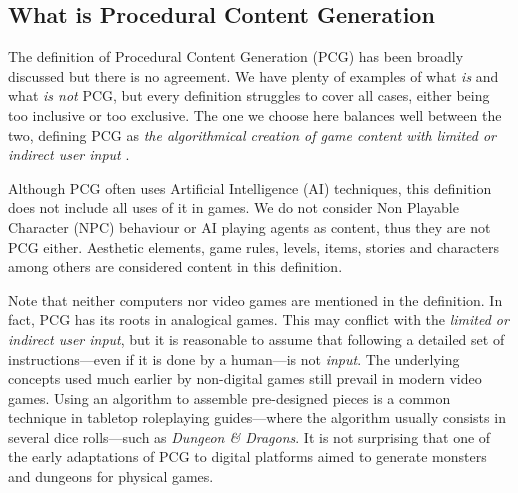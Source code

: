 

\subsection{What is Procedural Content Generation}

The definition of Procedural Content Generation (PCG) has been broadly discussed but there is no agreement. We have plenty of examples of what \textit{is} and what \textit{is not} PCG, but every definition struggles to cover all cases, either being too inclusive or too exclusive. The one we choose here balances well between the two, defining PCG as \textit{the algorithmical creation of game content with limited or indirect user input} \cite{togelius2011procedural}.


Although PCG often uses Artificial Intelligence (AI) techniques, this definition does not include all uses of it in games. We do not consider Non Playable Character (NPC) behaviour or AI playing agents as content, thus they are not PCG either. Aesthetic elements, game rules, levels, items, stories and characters among others are considered content in this definition.

Note that neither computers nor video games are mentioned in the definition. In fact, PCG has its roots in analogical games. This may conflict with the \textit{limited or indirect user input}, but it is reasonable to assume that following a detailed set of instructions---even if it is done by a human---is not \textit{input}. The underlying concepts used much earlier by non-digital games still prevail in modern video games. Using an algorithm to assemble pre-designed pieces is a common technique in tabletop roleplaying guides---where the algorithm usually consists in several dice rolls---such as \textit{Dungeon \& Dragons}. It is not surprising that one of the early adaptations of PCG to digital platforms aimed to generate monsters and dungeons for physical games.\cite{smith2015analog}



